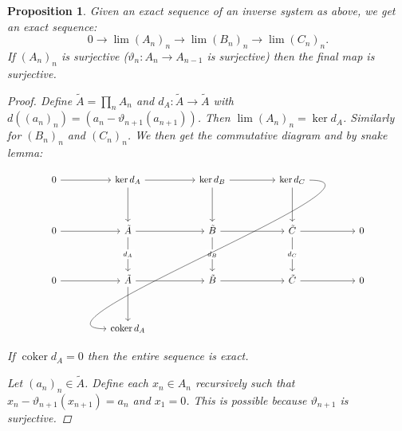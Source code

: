 \documentclass{article}
\DeclareMathOperator{\coker}{coker}
\newtheorem{proposition}[theorem]{Proposition}
\theoremstyle{definition}
\begin{document}
\begin{proposition}
    Given an exact sequence of an inverse system as above, we get an exact
    sequence:
    \[
        0\to \lim(A_{n})_{n}\to \lim(B_{n})_{n}\to \lim(C_{n})_{n}.
    \]
    If \((A_{n})_{n}\) is surjective (\(\vartheta_{n}:A_{n}\to A_{n-1}\) is
    surjective) then the final map is surjective.

    \begin{proof}
        Define \(\tilde{A}=\prod_{n}A_{n}\) and \(d_{A}:\tilde{A}\to\tilde{A}\)
        with \(d((a_{n})_{n})=(a_{n}-\vartheta_{n+1}(a_{n+1}))\). Then
        \(\lim(A_{n})_{n}=\ker d_{A}\). Similarly for \((B_{n})_{n}\) and
        \((C_{n})_{n}\). We then get the commutative diagram and by snake lemma:

        \[\begin{tikzcd}[ampersand replacement=\&]
                0 \&\& {\ker d_{A}} \&\& {\ker d_{B}} \&\& {\ker d_{C}} \\
                \\
                0 \&\& {\tilde{A}} \&\& {\tilde{B}} \&\& {\tilde{C}} \&\& 0 \\
                \\
                0 \&\& {\tilde{A}} \&\& {\tilde{B}} \&\& {\tilde{C}} \&\& 0 \\
                \\
                \&\& {\coker d_{A}}
                \arrow[from=3-1, to=3-3]
                \arrow[from=3-3, to=3-5]
                \arrow[from=3-5, to=3-7]
                \arrow[from=3-7, to=3-9]
                \arrow[from=5-1, to=5-3]
                \arrow[from=5-3, to=5-5]
                \arrow[from=5-5, to=5-7]
                \arrow[from=5-7, to=5-9]
                \arrow["{d_{A}}"{description}, from=3-3, to=5-3]
                \arrow["{d_{B}}"{description}, from=3-5, to=5-5]
                \arrow["{d_{C}}"{description}, from=3-7, to=5-7]
                \arrow[from=1-3, to=3-3]
                \arrow[from=1-5, to=3-5]
                \arrow[from=1-7, to=3-7]
                \arrow[from=1-1, to=1-3]
                \arrow[from=1-3, to=1-5]
                \arrow[from=1-5, to=1-7]
                \arrow[from=5-3, to=7-3]
                \arrow[out=0, in=180, looseness=1, from=1-7, to=7-3]
            \end{tikzcd}\]

        If \(\coker d_{A}=0\) then the entire sequence is exact.

        Let \((a_{n})_{n}\in\tilde{A}\). Define each \(x_{n}\in A_{n}\)
        recursively such that \(x_{n}-\vartheta_{n+1}(x_{n+1})=a_{n}\) and
        \(x_{1}=0\). This is possible because \(\vartheta_{n+1}\) is surjective.
    \end{proof}
\end{proposition}
\end{document}
